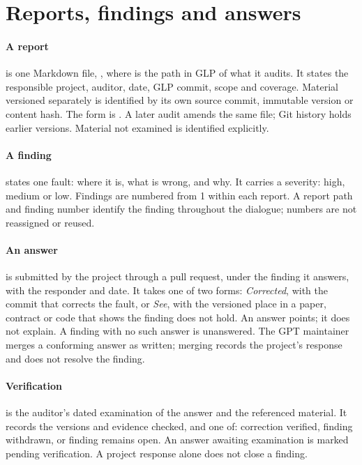\section{Reports, findings and answers}

\paragraph{A report} is one Markdown file, , where  is the path in GLP of what it audits. It states the responsible project, auditor, date, GLP commit, scope and coverage. Material versioned separately is identified by its own source commit, immutable version or content hash. The form is . A later audit amends the same file; Git history holds earlier versions. Material not examined is identified explicitly.

\paragraph{A finding} states one fault: where it is, what is wrong, and why. It carries a severity: high, medium or low. Findings are numbered from 1 within each report. A report path and finding number identify the finding throughout the dialogue; numbers are not reassigned or reused.

\paragraph{An answer} is submitted by the project through a pull request, under the finding it answers, with the responder and date. It takes one of two forms: \emph{Corrected}, with the commit that corrects the fault, or \emph{See}, with the versioned place in a paper, contract or code that shows the finding does not hold. An answer points; it does not explain. A finding with no such answer is unanswered. The GPT maintainer merges a conforming answer as written; merging records the project's response and does not resolve the finding.

\paragraph{Verification} is the auditor's dated examination of the answer and the referenced material. It records the versions and evidence checked, and one of: correction verified, finding withdrawn, or finding remains open. An answer awaiting examination is marked pending verification. A project response alone does not close a finding.

